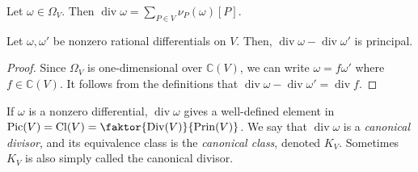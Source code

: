 \begin{definition}
    Let \( \omega \in \Omega_V \).
    Then \( \operatorname{div} \omega = \sum_{P \in V} \nu_P(\omega) [P] \).
\end{definition}
\begin{proposition}
    Let \( \omega, \omega' \) be nonzero rational differentials on \( V \).
    Then, \( \operatorname{div}\omega - \operatorname{div}\omega' \) is principal.
\end{proposition}
\begin{proof}
    Since \( \Omega_V \) is one-dimensional over \( \mathbb C(V) \), we can write \( \omega = f \omega' \) where \( f \in \mathbb C(V) \).
    It follows from the definitions that \( \operatorname{div}\omega - \operatorname{div}\omega' = \operatorname{div}f \).
\end{proof}
If \( \omega \) is a nonzero differential, \( \operatorname{div} \omega \) gives a well-defined element in \( \mathrm{Pic}(V) = \mathrm{Cl}(V) = \faktor{\mathrm{Div}(V)}{\mathrm{Prin}(V)} \).
We say that \( \operatorname{div}\omega \) is a \emph{canonical divisor}, and its equivalence class is the \emph{canonical class}, denoted \( K_V \).
Sometimes \( K_V \) is also simply called the canonical divisor.

